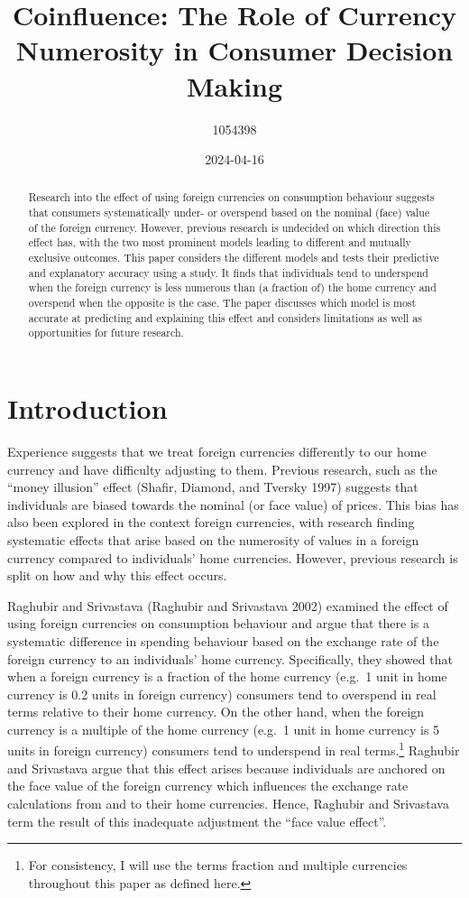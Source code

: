 \documentclass[
]{report}
\title{Coinfluence: The Role of Currency Numerosity in Consumer Decision
Making}
\author{1054398}
\affil{%
                  University of Oxford
              }
\date{2024-04-16}
\renewcommand*\contentsname{Table of contents}
\newcommand\contentsname{Table of contents}
\begin{document}
\maketitle
\begin{abstract}
Research into the effect of using foreign currencies on consumption
behaviour suggests that consumers systematically under- or overspend
based on the nominal (face) value of the foreign currency. However,
previous research is undecided on which direction this effect has, with
the two most prominent models leading to different and mutually
exclusive outcomes. This paper considers the different models and tests
their predictive and explanatory accuracy using a study. It finds that
individuals tend to underspend when the foreign currency is less
numerous than (a fraction of) the home currency and overspend when the
opposite is the case. The paper discusses which model is most accurate
at predicting and explaining this effect and considers limitations as
well as opportunities for future research.
\end{abstract}

\renewcommand*\contentsname{Table of contents}
{
\hypersetup{linkcolor=}
\setcounter{tocdepth}{2}
\tableofcontents
}
\chapter{Introduction}\label{introduction}

Experience suggests that we treat foreign currencies differently to our
home currency and have difficulty adjusting to them. Previous research,
such as the ``money illusion'' effect (Shafir, Diamond, and Tversky
1997) suggests that individuals are biased towards the nominal (or face
value) of prices. This bias has also been explored in the context
foreign currencies, with research finding systematic effects that arise
based on the numerosity of values in a foreign currency compared to
individuals' home currencies. However, previous research is split on how
and why this effect occurs.

Raghubir and Srivastava (Raghubir and Srivastava 2002) examined the
effect of using foreign currencies on consumption behaviour and argue
that there is a systematic difference in spending behaviour based on the
exchange rate of the foreign currency to an individuals' home currency.
Specifically, they showed that when a foreign currency is a fraction of
the home currency (e.g.~1 unit in home currency is 0.2 units in foreign
currency) consumers tend to overspend in real terms relative to their
home currency. On the other hand, when the foreign currency is a
multiple of the home currency (e.g.~1 unit in home currency is 5 units
in foreign currency) consumers tend to underspend in real
terms.\footnote{For consistency, I will use the terms fraction and
  multiple currencies throughout this paper as defined here.} Raghubir
and Srivastava argue that this effect arises because individuals are
anchored on the face value of the foreign currency which influences the
exchange rate calculations from and to their home currencies. Hence,
Raghubir and Srivastava term the result of this inadequate adjustment
the ``face value effect''.
\end{document}

